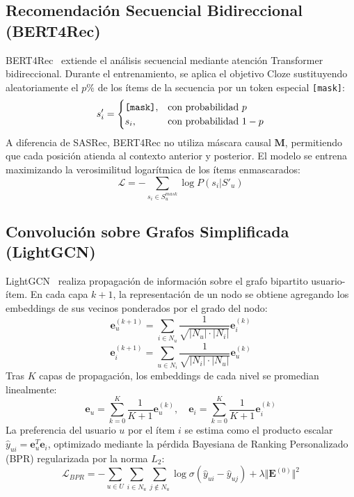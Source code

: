 \documentclass[journal]{IEEEtran}
\begin{document}
\subsection{Recomendación Secuencial Bidireccional (BERT4Rec)}
BERT4Rec~\cite{sun2019bert4rec} extiende el análisis secuencial mediante atención Transformer bidireccional. Durante el entrenamiento, se aplica el objetivo Cloze sustituyendo aleatoriamente el $p\%$ de los ítems de la secuencia por un token especial \texttt{[mask]}:
\begin{equation}
s'_i = \begin{cases} \text{\texttt{[mask]}}, & \text{con probabilidad } p \\ s_i, & \text{con probabilidad } 1-p \end{cases}
\end{equation}
A diferencia de SASRec, BERT4Rec no utiliza máscara causal $\mathbf{M}$, permitiendo que cada posición atienda al contexto anterior y posterior. El modelo se entrena maximizando la verosimilitud logarítmica de los ítems enmascarados:
\begin{equation}
\mathcal{L} = -\sum_{s_i \in S_u^{mask}} \log P(s_i | S'_u)
\end{equation}

\subsection{Convolución sobre Grafos Simplificada (LightGCN)}
LightGCN~\cite{he2020lightgcn} realiza propagación de información sobre el grafo bipartito usuario-ítem. En cada capa $k+1$, la representación de un nodo se obtiene agregando los embeddings de sus vecinos ponderados por el grado del nodo:
\begin{equation}
\mathbf{e}_u^{(k+1)} = \sum\limits_{i \in N_u} \frac{1}{\sqrt{|N_u| \cdot |N_i|}} \mathbf{e}_i^{(k)}
\end{equation}
\begin{equation}
\mathbf{e}_i^{(k+1)} = \sum\limits_{u \in N_i} \frac{1}{\sqrt{|N_i| \cdot |N_u|}} \mathbf{e}_u^{(k)}
\end{equation}
Tras $K$ capas de propagación, los embeddings de cada nivel se promedian linealmente:
\begin{equation}
\mathbf{e}_u = \sum\limits_{k=0}^K \frac{1}{K+1} \mathbf{e}_u^{(k)}, \quad \mathbf{e}_i = \sum\limits_{k=0}^K \frac{1}{K+1} \mathbf{e}_i^{(k)}
\end{equation}
La preferencia del usuario $u$ por el ítem $i$ se estima como el producto escalar $\hat{y}_{ui} = \mathbf{e}_u^T \mathbf{e}_i$, optimizado mediante la pérdida Bayesiana de Ranking Personalizado (BPR) regularizada por la norma $L_2$:
\begin{equation}
\mathcal{L}_{BPR} = -\sum\limits_{u \in U} \sum\limits_{i \in N_u} \sum\limits_{j \notin N_u} \log \sigma(\hat{y}_{ui} - \hat{y}_{uj}) + \lambda \Vert \mathbf{E}^{(0)} \Vert^2
\end{equation}
\end{document}
